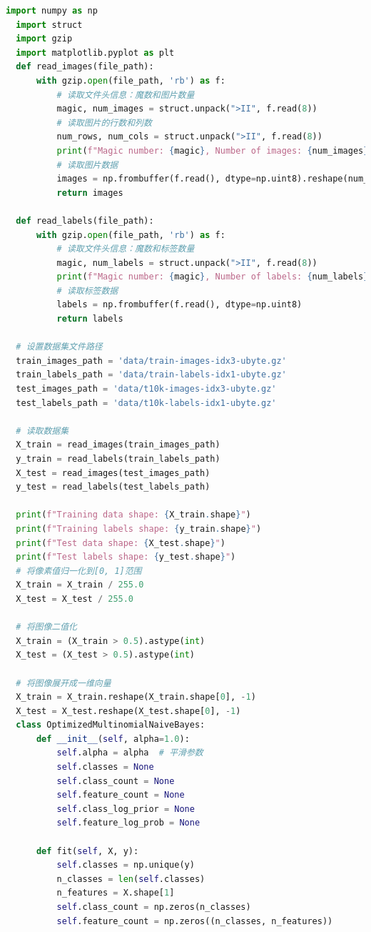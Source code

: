 \documentclass[12pt]{article}
\begin{document}
\begin{lstlisting}[language=Python]
  import numpy as np
  import struct
  import gzip
  import matplotlib.pyplot as plt
  def read_images(file_path):
      with gzip.open(file_path, 'rb') as f:
          # 读取文件头信息：魔数和图片数量
          magic, num_images = struct.unpack(">II", f.read(8))
          # 读取图片的行数和列数
          num_rows, num_cols = struct.unpack(">II", f.read(8))
          print(f"Magic number: {magic}, Number of images: {num_images}, Rows: {num_rows}, Columns: {num_cols}")
          # 读取图片数据
          images = np.frombuffer(f.read(), dtype=np.uint8).reshape(num_images, num_rows, num_cols)
          return images
  
  def read_labels(file_path):
      with gzip.open(file_path, 'rb') as f:
          # 读取文件头信息：魔数和标签数量
          magic, num_labels = struct.unpack(">II", f.read(8))
          print(f"Magic number: {magic}, Number of labels: {num_labels}")
          # 读取标签数据
          labels = np.frombuffer(f.read(), dtype=np.uint8)
          return labels
  
  # 设置数据集文件路径
  train_images_path = 'data/train-images-idx3-ubyte.gz'
  train_labels_path = 'data/train-labels-idx1-ubyte.gz'
  test_images_path = 'data/t10k-images-idx3-ubyte.gz'
  test_labels_path = 'data/t10k-labels-idx1-ubyte.gz'
  
  # 读取数据集
  X_train = read_images(train_images_path)
  y_train = read_labels(train_labels_path)
  X_test = read_images(test_images_path)
  y_test = read_labels(test_labels_path)
  
  print(f"Training data shape: {X_train.shape}")
  print(f"Training labels shape: {y_train.shape}")
  print(f"Test data shape: {X_test.shape}")
  print(f"Test labels shape: {y_test.shape}")
  # 将像素值归一化到[0, 1]范围
  X_train = X_train / 255.0
  X_test = X_test / 255.0
  
  # 将图像二值化
  X_train = (X_train > 0.5).astype(int)
  X_test = (X_test > 0.5).astype(int)
  
  # 将图像展开成一维向量
  X_train = X_train.reshape(X_train.shape[0], -1)
  X_test = X_test.reshape(X_test.shape[0], -1)
  class OptimizedMultinomialNaiveBayes:
      def __init__(self, alpha=1.0):
          self.alpha = alpha  # 平滑参数
          self.classes = None
          self.class_count = None
          self.feature_count = None
          self.class_log_prior = None
          self.feature_log_prob = None
  
      def fit(self, X, y):
          self.classes = np.unique(y)
          n_classes = len(self.classes)
          n_features = X.shape[1]
          self.class_count = np.zeros(n_classes)
          self.feature_count = np.zeros((n_classes, n_features))
  

\end{lstlisting}
\end{document}
